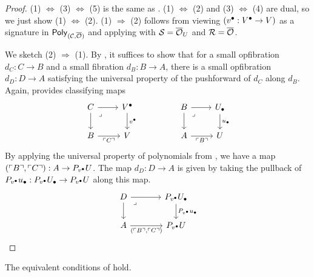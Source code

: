 \begin{proof}
  (1) $\Leftrightarrow$ (3) $\Leftrightarrow$ (5) is the same as .
  (1) $\Leftrightarrow$ (2) and (3) $\Leftrightarrow$ (4) are dual,
  so we just show (1) $\Leftrightarrow$ (2).
  (1) $\Rightarrow$ (2) follows from viewing
  $({v^\bullet} : {V^\bullet} \to V)$ as
  a signature in $\mathsf{Poly}_{(\mathcal{C},{\overline{{\mathcal{O}}}})}$
  and applying 
  with $\mathcal{S} = {\overline{{\mathcal{O}}}}_U$ and $\mathcal{R} = {\overline{{\mathcal{O}}}}$.

  We sketch (2) $\Rightarrow$ (1).
  By ,
  it suffices to show that for a small opfibration $d_C : C \to B$ and
  a small fibration $d_B : B \to A$,
  there is a small opfibration $d_D : D \to A$
  satisfying the universal property of the pushforward of $d_C$ along $d_B$.
  Again,  provides classifying maps
  \[\begin{tikzcd}
    C & \Vlow && B & \Ulow \\
    B & \V && A & \U
    \arrow[from=1-1, to=1-2]
    \arrow[from=1-1, to=2-1]
    \arrow["\lrcorner"{anchor=center, pos=0.125}, draw=none, from=1-1, to=2-2]
    \arrow["\vlow", from=1-2, to=2-2]
    \arrow[from=1-4, to=1-5]
    \arrow[from=1-4, to=2-4]
    \arrow["\lrcorner"{anchor=center, pos=0.125}, draw=none, from=1-4, to=2-5]
    \arrow["\ulow", from=1-5, to=2-5]
    \arrow["{{\ulcorner C \urcorner}}"', from=2-1, to=2-2]
    \arrow["{{\ulcorner B \urcorner}}"', from=2-4, to=2-5]
  \end{tikzcd}\]
  By applying the universal property of polynomials from ,
  we have a map
  $(\ulcorner B \urcorner, \ulcorner C \urcorner) : A \to P_{v^\bullet} U$.
  The map $d_D : D \to A$ is given by taking the pullback of
  $P_{v^\bullet} {u_\bullet} : P_{v^\bullet} {U_\bullet} \to P_{v^\bullet} U$ along this map.
  \[ \begin{tikzcd}[column sep = large]
      D & {P_\vlow \Ulow} \\
      A & {P_\vlow \U}
      \arrow[from=1-1, to=1-2]
      \arrow[from=1-1, to=2-1]
      \arrow["\lrcorner"{anchor=center, pos=0.125}, draw=none, from=1-1, to=2-2]
      \arrow["{P_\vlow \ulow}", from=1-2, to=2-2]
      \arrow["{(\ulcorner B \urcorner, \ulcorner C \urcorner)}"', from=2-1, to=2-2]
    \end{tikzcd} \]
\end{proof}

\begin{axiom}\label{ax:pi}
  The equivalent conditions of  hold.
\end{axiom}

